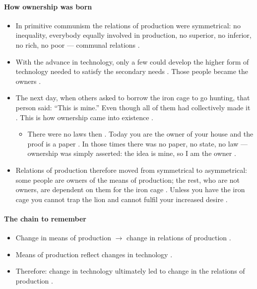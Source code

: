 \paragraph{How ownership was born}
\begin{itemize}
    \item In primitive communism the relations of production were symmetrical: no inequality, everybody equally involved in production, no superior, no inferior, no rich, no poor --- communal relations .
    \item With the advance in technology, only a few could develop the higher form of technology needed to satisfy the secondary needs . Those people became the owners .
    \item The next day, when others asked to borrow the iron cage to go hunting, that person said: ``This is mine.''  Even though all of them had collectively made it . This is how ownership came into existence .
    \begin{itemize}
        \item There were no laws then . Today you are the owner of your house and the proof is a paper . In those times there was no paper, no state, no law --- ownership was simply asserted: the idea is mine, so I am the owner .
    \end{itemize}
    \item Relations of production therefore moved from symmetrical to asymmetrical: some people are owners of the means of production; the rest, who are not owners, are dependent on them for the iron cage . Unless you have the iron cage you cannot trap the lion and cannot fulfil your increased desire .
\end{itemize}

\paragraph{The chain to remember}
\begin{itemize}
    \item Change in means of production $\rightarrow$ change in relations of production .
    \item Means of production reflect changes in technology .
    \item Therefore: change in technology ultimately led to change in the relations of production .
\end{itemize}

